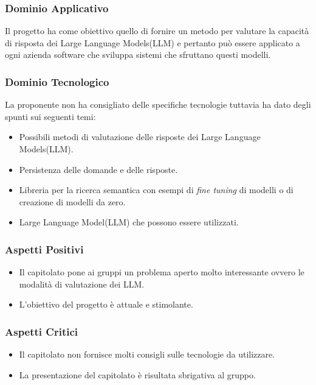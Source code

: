 \documentclass[a4paper, 12pt]{article}
\begin{document}
\subsubsection{Dominio Applicativo}
Il progetto ha come obiettivo quello di fornire un metodo per valutare la capacità di risposta dei Large Language Models(LLM) e pertanto può essere applicato a ogni azienda software che sviluppa sistemi che sfruttano questi modelli.

\subsubsection{Dominio Tecnologico}
La proponente non ha consigliato delle specifiche tecnologie tuttavia ha dato degli spunti sui seguenti temi:
\begin{itemize}
    \item Possibili metodi di valutazione delle risposte dei Large Language Models(LLM).
    \item Persistenza delle domande e delle risposte.
    \item Libreria per la ricerca semantica con esempi di \textit{fine tuning} di modelli o di creazione di modelli da zero.
    \item Large Language Model(LLM) che possono essere utilizzati.
\end{itemize}


\subsubsection{Aspetti Positivi}
\begin{itemize}
    \item Il capitolato pone ai gruppi un problema aperto molto interessante ovvero le modalità di valutazione dei LLM.
    \item L'obiettivo del progetto è attuale e stimolante.
\end{itemize}

\subsubsection{Aspetti Critici}
\begin{itemize}
    \item Il capitolato non fornisce molti consigli sulle tecnologie da utilizzare.
    \item La presentazione del capitolato è risultata sbrigativa al gruppo.
\end{itemize}
\end{document}
